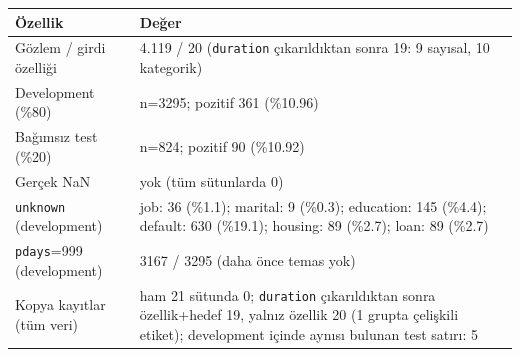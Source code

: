 \begin{tabular}{p{4.1cm}p{11.4cm}}\toprule
Özellik & Değer \\\midrule
Gözlem / girdi özelliği & 4.119 / 20 (\texttt{duration} çıkarıldıktan sonra 19: 9 sayısal, 10 kategorik) \\
Development (\%80) & n=3295; pozitif 361 (\%10.96) \\
Bağımsız test (\%20) & n=824; pozitif 90 (\%10.92) \\
Gerçek NaN & yok (tüm sütunlarda 0) \\
\texttt{unknown} (development) & job: 36 (\%1.1); marital: 9 (\%0.3); education: 145 (\%4.4); default: 630 (\%19.1); housing: 89 (\%2.7); loan: 89 (\%2.7) \\
\texttt{pdays}=999 (development) & 3167 / 3295 (daha önce temas yok) \\
Kopya kayıtlar (tüm veri) & ham 21 sütunda 0; \texttt{duration} çıkarıldıktan sonra özellik+hedef 19, yalnız özellik 20 (1 grupta çelişkili etiket); development içinde aynısı bulunan test satırı: 5 \\
\bottomrule\end{tabular}